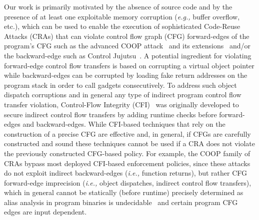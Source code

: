 Our work is primarily motivated by the absence of source code and by the presence of at least one exploitable
memory corruption (\textit{e.g.,} buffer overflow, etc.), which can be used to enable the execution of sophisticated Code-Reuse Attacks 
(CRAs) that can violate control flow graph (CFG) forward-edges 
of the program's CFG such as the advanced COOP attack~\cite{schuster:coop} and its 
extensions~\cite{crane:readactor++, subversive-c:lettner, ctf:coop, loop:oriented} and/or the backward-edge such as Control Jujutsu~\cite{jujutsu}. 
A potential ingredient for violating forward-edge control flow transfers is based on corrupting a virtual object pointer 
while backward-edges can be corrupted by loading fake return addresses on the program stack in order to call gadgets consecutively.
To address such object dispatch corruptions
and in general any type of indirect program control flow transfer violation, Control-Flow Integrity (CFI)~\cite{abadi:cfi2, abadi:cfi} 
was originally developed to secure indirect control flow transfers by adding runtime checks before forward-edges and backward-edges. 
While CFI-based techniques that rely on the construction of a precise CFG are effective \cite{cfi:survey} and, in general, if CFGs are carefully constructed and 
sound \cite{cfg:sound} these techniques cannot be used if a CRA does not violate the previously constructed CFG-based policy.
For example, the COOP family of CRAs bypass most deployed CFI-based enforcement policies, since 
these attacks do not exploit indirect backward-edges (\textit{i.e.,} function returns), but rather CFG
forward-edge imprecision (\textit{i.e.,} object dispatches, indirect control flow transfers), which in general cannot be statically (before runtime) precisely determined 
as alias analysis in program binaries is undecidable~\cite{alias:undecidable} and certain program CFG edges are input dependent.

